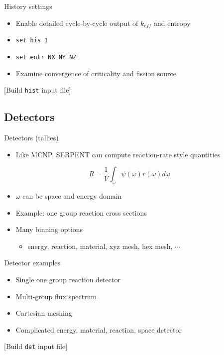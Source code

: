 \documentclass{beamer}
\newcommand{\examplefile}[1]{\centerline{[Build \texttt{#1} input file]}}
\begin{document}
\begin{frame}{History settings}
    \begin{itemize}
        \item Enable detailed cycle-by-cycle output of $k_{eff}$ and entropy
        \item \texttt{set his 1}
        \item \texttt{set entr NX NY NZ}
        \item Examine convergence of criticality and fission source
    \end{itemize}
    \examplefile{hist}
\end{frame}

\subsection{Detectors}
\begin{frame}{Detectors (tallies)}
    \begin{itemize}
        \item Like MCNP, SERPENT can compute reaction-rate style quantities
    \end{itemize}
    \begin{equation}
        R = \frac{1}{V}\int_\omega\psi(\omega)r(\omega)d\omega
    \end{equation}
    \begin{itemize}
        \item $\omega$ can be space and energy domain
        \item Example: one group reaction cross sections
        \item Many binning options
            \begin{itemize}
                \item energy, reaction, material, xyz mesh, hex mesh, $\cdots$
            \end{itemize}
    \end{itemize}
\end{frame}

\begin{frame}{Detector examples}
    \begin{itemize}
        \item Single one group reaction detector
        \item Multi-group flux spectrum
        \item Cartesian meshing
        \item Complicated energy, material, reaction, space detector
    \end{itemize}
    \examplefile{det}
\end{frame}
\end{document}
